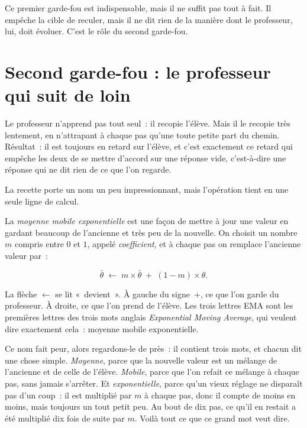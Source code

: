Ce premier garde-fou est indispensable, mais il ne suffit pas tout à fait. Il
empêche la cible de reculer, mais il ne dit rien de la manière dont le
professeur, lui, doit évoluer. C'est le rôle du second garde-fou.

\section{Second garde-fou : le professeur qui suit de loin}
\label{sec:ema}

\begin{enclair}
Le professeur n'apprend pas tout seul~: il recopie l'élève. Mais il le
recopie très lentement, en n'attrapant à chaque pas qu'une toute petite
part du chemin. Résultat~: il est toujours en retard sur l'élève, et
c'est exactement ce retard qui empêche les deux de se mettre d'accord sur
une réponse vide, c'est-à-dire une réponse qui ne dit rien de ce que l'on
regarde.
\end{enclair}

La recette porte un nom un peu impressionnant, mais l'opération tient en une
seule ligne de calcul.

\begin{definition}
La \emph{moyenne mobile exponentielle} est une façon de mettre à jour une
valeur en gardant beaucoup de l'ancienne et très peu de la nouvelle. On
choisit un nombre $m$ compris entre $0$ et $1$, appelé
\emph{coefficient}, et à chaque pas on remplace l'ancienne valeur par~:

\[
  \bar{\theta} \;\leftarrow\; m \times \bar{\theta} \;+\; (1 - m) \times \theta .
\]

La flèche $\leftarrow$ se lit «~devient~». À gauche du signe~$+$, ce que
l'on garde du professeur. À droite, ce que l'on prend de l'élève. Les trois
lettres EMA sont les premières lettres des trois mots anglais
\emph{Exponential Moving Average}, qui veulent dire exactement cela~:
moyenne mobile exponentielle.
\end{definition}

Ce nom fait peur, alors regardons-le de près~: il contient trois mots, et
chacun dit une chose simple. \emph{Moyenne}, parce que la nouvelle valeur
est un mélange de l'ancienne et de celle de l'élève. \emph{Mobile}, parce
que l'on refait ce mélange à chaque pas, sans jamais s'arrêter. Et
\emph{exponentielle}, parce qu'un vieux réglage ne disparaît pas d'un coup~:
il est multiplié par $m$ à chaque pas, donc il compte de moins en moins,
mais toujours un tout petit peu. Au bout de dix pas, ce qu'il en restait a
été multiplié dix fois de suite par $m$. Voilà tout ce que ce grand mot veut
dire.


